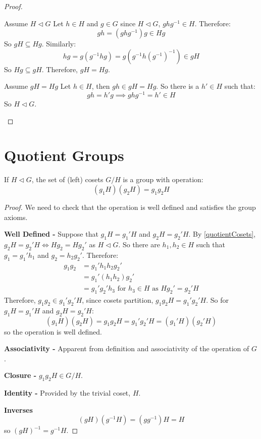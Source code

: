 \documentclass[../main.tex]{subfiles}
\begin{document}
\begin{proof}
  \begin{proofdirection}{Assume $H \lhd G$}
    Let $h \in H$ and $g \in G$ since $H \lhd G$, $ghg^{-1} \in H$.
    Therefore:
    \[
      gh = (ghg^{-1})g \in Hg
    \]
    So $gH \subseteq Hg$.
    Similarly:
    \[
      hg = g(g^{-1} h g) =g(g^{-1} h(g^{-1})^{-1}) \in gH
    \]
    So $Hg \subseteq gH$.
    Therefore, $gH = Hg$.
  \end{proofdirection}
  \begin{proofdirection}{Assume $gH = Hg$}
    Let $h \in H$, then $gh \in gH  = Hg$. So there is a $h' \in H$ such that:
    \[
      gh = h'g \implies ghg^{-1} = h' \in H
    \]
    So $H \lhd G$.
  \end{proofdirection}
\end{proof}
\section{Quotient Groups}
\label{quotientGroups}
\begin{theorem}
  \label{quotientTheorem}
  If $H \lhd G$, the set of (left) cosets $G / H$ is a group with operation:
  \[
    (g_1H)(g_2H) = g_1g_2H
  \]
\end{theorem}
\begin{proof}
  We need to check that the operation is well defined and satisfies the group axioms.

  \textbf{Well Defined -} Suppose that $g_1 H = g_1' H$ and $g_2H = g_2'H$.
  By \cref{quotientCosets}, $g_2H = g_2'H \iff Hg_2 = Hg_2'$ as $H \lhd G$.
  So there are $h_1, h_2 \in H$ such that $g_1 = g_1'h_1$ and $g_2 = h_2 g_2'$.
  Therefore:
  \begin{align*}
    g_1g_2 &= g_1'h_1 h_2 g_2' \\
           &= g_1'(h_1 h_2) g_2' \\
           &= g_1' g_2' h_3 \text{ for $h_3 \in H$ as $Hg_2' = g_2'H$}
  \end{align*}
  Therefore, $g_1g_2 \in g_1'g_2'H$, since cosets partition, $g_1g_2H = g_1'g_2'H$.
  So for $g_1H = g_1'H$ and $g_2H = g_2'H$:
  \[
    (g_1H)(g_2H) = g_1g_2H = g_1'g_2'H = (g_1'H)(g_2'H)
  \]
  so the operation is well defined.

  \textbf{Associativity -} Apparent from definition and associativity of the operation of $G$.

  \textbf{Closure -} $g_1g_2H \in G / H$.

  \textbf{Identity -} Provided by the trivial coset, $H$.

  \textbf{Inverses}
  \[
    (gH)(g^{-1}H) = (gg^{-1})H = H
  \]
  so $(gH)^{-1} = g^{-1}H$.
\end{proof}
\end{document}
